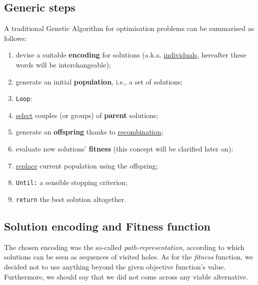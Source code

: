 \documentclass[letterpaper, 10 pt, conference]{ieeeconf}  %
\begin{document}
\subsection{Generic steps} 
A traditional Genetic Algorithm for optimisation problems can be summarised as follows:
\begin{enumerate}
\item devise a suitable \textbf{encoding} for solutions (a.k.a. \underline{individuals}, hereafter these words will be interchangeable);
\item generate an initial \textbf{population}, i.e., a set of solutions;
\item \texttt{Loop}:
\item \hspace*{ 0.2 mm} \underline{select} couples (or groups) of \textbf{parent} solutions;
\item \hspace*{ 0.2 mm} generate an \textbf{offspring} thanks to \underline{recombination};
\item \hspace*{ 0.2 mm} evaluate new solutions' \textbf{fitness} (this concept will be \hspace*{ 0.2 mm} clarified later on);
\item \hspace*{ 0.2 mm} \underline{replace} current population using the offspring;
\item \texttt{Until:} a sensible stopping criterion;
\item \texttt{return} the best solution altogether.
\end{enumerate}

\subsection{Solution encoding and Fitness function}
The chosen encoding was the so-called \textit{path-representation}, according to which solutions can be seen as sequences of visited holes. \newline
As for the \textit{fitness} function, we decided not to use anything beyond the given objective function's value. Furthermore, we should say that we did not come across any viable alternative.
\end{document}
